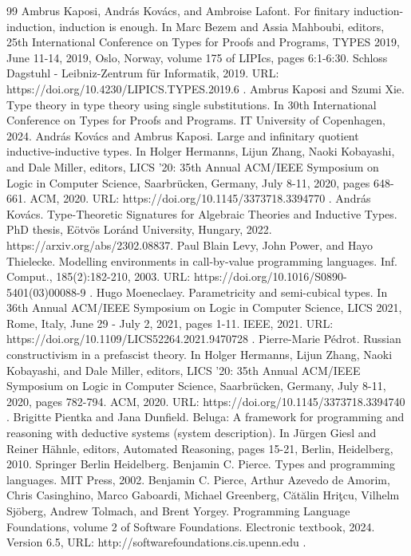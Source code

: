 \begin{thebibliography}{99}
 Ambrus Kaposi, András Kovács, and Ambroise Lafont. For finitary induction-induction, induction is enough. In Marc Bezem and Assia Mahboubi, editors, 25th International Conference on Types for Proofs and Programs, TYPES 2019, June 11-14, 2019, Oslo, Norway, volume 175 of LIPIcs, pages 6:1-6:30. Schloss Dagstuhl - Leibniz-Zentrum für Informatik, 2019. URL: https://doi.org/10.4230/LIPICS.TYPES.2019.6 .
 Ambrus Kaposi and Szumi Xie. Type theory in type theory using single substitutions. In 30th International Conference on Types for Proofs and Programs. IT University of Copenhagen, 2024.
 András Kovács and Ambrus Kaposi. Large and infinitary quotient inductive-inductive types. In Holger Hermanns, Lijun Zhang, Naoki Kobayashi, and Dale Miller, editors, LICS '20: 35th Annual ACM/IEEE Symposium on Logic in Computer Science, Saarbrücken, Germany, July 8-11, 2020, pages 648-661. ACM, 2020. URL: https://doi.org/10.1145/3373718.3394770 .
 András Kovács. Type-Theoretic Signatures for Algebraic Theories and Inductive Types. PhD thesis, Eötvös Loránd University, Hungary, 2022. https://arxiv.org/abs/2302.08837.
 Paul Blain Levy, John Power, and Hayo Thielecke. Modelling environments in call-by-value programming languages. Inf. Comput., 185(2):182-210, 2003. URL: https://doi.org/10.1016/S0890-5401(03)00088-9 .
 Hugo Moeneclaey. Parametricity and semi-cubical types. In 36th Annual ACM/IEEE Symposium on Logic in Computer Science, LICS 2021, Rome, Italy, June 29 - July 2, 2021, pages 1-11. IEEE, 2021. URL: https://doi.org/10.1109/LICS52264.2021.9470728 .
 Pierre-Marie Pédrot. Russian constructivism in a prefascist theory. In Holger Hermanns, Lijun Zhang, Naoki Kobayashi, and Dale Miller, editors, LICS '20: 35th Annual ACM/IEEE Symposium on Logic in Computer Science, Saarbrücken, Germany, July 8-11, 2020, pages 782-794. ACM, 2020. URL: https://doi.org/10.1145/3373718.3394740 .
 Brigitte Pientka and Jana Dunfield. Beluga: A framework for programming and reasoning with deductive systems (system description). In Jürgen Giesl and Reiner Hähnle, editors, Automated Reasoning, pages 15-21, Berlin, Heidelberg, 2010. Springer Berlin Heidelberg.
 Benjamin C. Pierce. Types and programming languages. MIT Press, 2002.
 Benjamin C. Pierce, Arthur Azevedo de Amorim, Chris Casinghino, Marco Gaboardi, Michael Greenberg, Cătălin Hriţcu, Vilhelm Sjöberg, Andrew Tolmach, and Brent Yorgey. Programming Language Foundations, volume 2 of Software Foundations. Electronic textbook, 2024. Version 6.5, URL: http://softwarefoundations.cis.upenn.edu .

\end{thebibliography}
